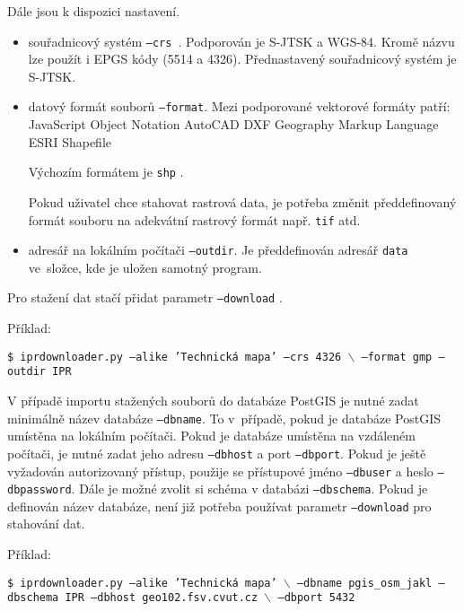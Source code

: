 Dále jsou k dispozici nastavení.
\begin{itemize}
    \item souřadnicový systém {\tt ---crs }. Podporován je S-JTSK a WGS-84. Kromě názvu lze použít i EPGS kódy (5514 a 4326). Přednastavený souřadnicový systém je S-JTSK.

    \item datový formát souborů {\tt ---format}.
    Mezi podporované vektorové formáty patří:
          JavaScript Object Notation
          AutoCAD DXF
          Geography Markup Language
          ESRI Shapefile
        
        Výchozím formátem je {\tt shp} .
         
    Pokud uživatel chce stahovat rastrová data, je potřeba změnit
    předdefinovaný formát souboru na adekvátní rastrový formát např.
    {\tt tif} atd.
    
    \item adresář na lokálním počítači {\tt ---outdir}. Je předdefinován
    adresář {\tt data} ve~složce, kde je uložen samotný program.

\end{itemize}

Pro stažení dat stačí přidat parametr {\tt ---download} .

Příklad:

{\tt \$ iprdownloader.py ---alike 'Technická mapa' ---crs 4326 $\backslash$ \newline ---format gmp ---outdir IPR}

V případě importu stažených souborů do databáze PostGIS je nutné zadat minimálně název databáze {\tt ---dbname}.
To v~případě, pokud je databáze PostGIS umístěna na lokálním počítači. Pokud
je databáze umístěna na vzdáleném počítači, je nutné zadat jeho adresu
{\tt ---dbhost} a port {\tt ---dbport}. Pokud je ještě vyžadován
autorizovaný přístup, použije se přístupové jméno {\tt ---dbuser} a
heslo {\tt ---dbpassword}. Dále je možné zvolit si schéma v databázi
{\tt ---dbschema}. Pokud je definován název databáze, není již potřeba
používat parametr {\tt ---download} pro stahování dat.

Příklad:

{\tt \$ iprdownloader.py ---alike 'Technická mapa' $\backslash$ \newline ---dbname pgis\_osm\_jakl ---dbschema IPR ---dbhost geo102.fsv.cvut.cz  $\backslash$ \newline ---dbport 5432 } 
 

